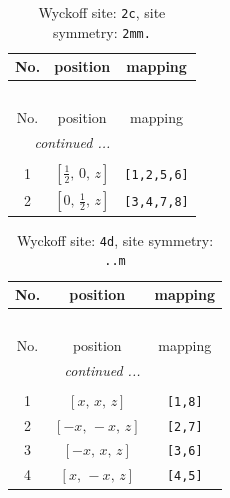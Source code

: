 \documentclass[fleqn,8pt]{jsarticle}
\begin{document}
\begin{longtable}{ccc}
\caption{Wyckoff site: {\tt 2c}, site symmetry: {\tt 2mm.}}
 \\
 \hline \hline
No. & position & mapping \\ \hline \endfirsthead

\multicolumn{2}{l}{\tablename\ \thetable{}} \\
 \hline \hline
No. & position & mapping \\ \hline \endhead

 \hline \hline
\multicolumn{2}{r}{\footnotesize\it continued ...} \\ \endfoot

 \hline \hline
\multicolumn{2}{r}{} \\ \endlastfoot

1 & $\left[ \frac{1}{2},\, 0,\, z \right]$ & {\tt [1,2,5,6]} \\ \hline
2 & $\left[ 0,\, \frac{1}{2},\, z \right]$ & {\tt [3,4,7,8]} \\
\end{longtable}
\renewcommand{\arraystretch}{1.2}
\begin{longtable}{ccc}
\caption{Wyckoff site: {\tt 4d}, site symmetry: {\tt ..m}}
 \\
 \hline \hline
No. & position & mapping \\ \hline \endfirsthead

\multicolumn{2}{l}{\tablename\ \thetable{}} \\
 \hline \hline
No. & position & mapping \\ \hline \endhead

 \hline \hline
\multicolumn{2}{r}{\footnotesize\it continued ...} \\ \endfoot

 \hline \hline
\multicolumn{2}{r}{} \\ \endlastfoot

1 & $\left[ x,\, x,\, z \right]$ & {\tt [1,8]} \\ \hline
2 & $\left[ - x,\, - x,\, z \right]$ & {\tt [2,7]} \\ \hline
3 & $\left[ - x,\, x,\, z \right]$ & {\tt [3,6]} \\ \hline
4 & $\left[ x,\, - x,\, z \right]$ & {\tt [4,5]} \\
\end{longtable}
\renewcommand{\arraystretch}{1.2}
\end{document}
